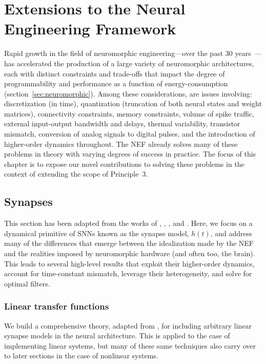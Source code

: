 \chapter{Extensions to the Neural Engineering Framework}
\label{chapt:nef-extensions}

Rapid growth in the field of neuromorphic engineering---over the past 30 years~\citep{mead1988silicon}---has accelerated the production of a large variety of neuromorphic architectures, each with distinct constraints and trade-offs that impact the degree of programmability and performance as a function of energy-consumption (section~\ref{sec:neuromorphic}).
Among these considerations, are issues involving:
discretization (in time), quantization (truncation of both neural states and weight matrices), connectivity constraints, memory constraints, volume of spike traffic, external input-output bandwidth and delays, thermal variability, transistor mismatch, conversion of analog signals to digital pulses, and the introduction of higher-order dynamics throughout.
The NEF already solves many of these problems in theory with varying degrees of success in practice.
The focus of this chapter is to expose our novel contributions to solving these problems in the context of extending the scope of Principle~3.

\section{Synapses}
\label{sec:synaptic-extensions}

This section has been adapted from the works of \citet[][patent pending]{dynamicspatent}, \citet{voelker2017iscas}, \citet{voelker2017neuromorphic}, and \citet{voelker2018}.
Here, we focus on a dynamical primitive of SNNs known as the synapse model, $h(t)$, and address many of the differences that emerge between the idealization made by the NEF and the realities imposed by neuromorphic hardware (and often too, the brain).
This leads to several high-level results that exploit their higher-order dynamics, account for time-constant mismatch, leverage their heterogeneity, and solve for optimal filters.

\subsection{Linear transfer functions}
\label{sec:linear-extensions}

We build a comprehensive theory, adapted from \citet{voelker2018}, for including arbitrary linear synapse models in the neural architecture.
This is applied to the case of implementing linear systems, but many of these same techniques also carry over to later sections in the case of nonlinear systems. %


